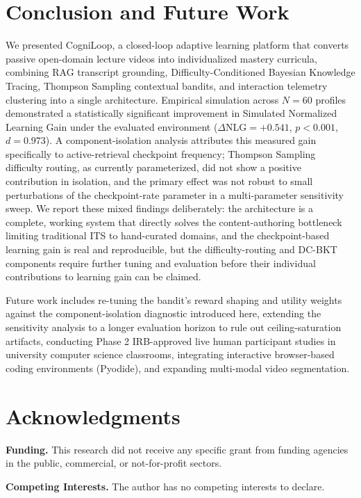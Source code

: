 \documentclass[notitlepage,12pt]{jedm}
\begin{document}
\section{Conclusion and Future Work}
We presented CogniLoop, a closed-loop adaptive learning platform that converts passive open-domain lecture videos into individualized mastery curricula, combining RAG transcript grounding, Difficulty-Conditioned Bayesian Knowledge Tracing, Thompson Sampling contextual bandits, and interaction telemetry clustering into a single architecture. Empirical simulation across $N=60$ profiles demonstrated a statistically significant improvement in Simulated Normalized Learning Gain under the evaluated environment ($\Delta\text{NLG}=+0.541$, $p<0.001$, $d=0.973$). A component-isolation analysis attributes this measured gain specifically to active-retrieval checkpoint frequency; Thompson Sampling difficulty routing, as currently parameterized, did not show a positive contribution in isolation, and the primary effect was not robust to small perturbations of the checkpoint-rate parameter in a multi-parameter sensitivity sweep. We report these mixed findings deliberately: the architecture is a complete, working system that directly solves the content-authoring bottleneck limiting traditional ITS to hand-curated domains, and the checkpoint-based learning gain is real and reproducible, but the difficulty-routing and DC-BKT components require further tuning and evaluation before their individual contributions to learning gain can be claimed.

Future work includes re-tuning the bandit's reward shaping and utility weights against the component-isolation diagnostic introduced here, extending the sensitivity analysis to a longer evaluation horizon to rule out ceiling-saturation artifacts, conducting Phase 2 IRB-approved live human participant studies in university computer science classrooms, integrating interactive browser-based coding environments (Pyodide), and expanding multi-modal video segmentation.

\section*{Acknowledgments}

\noindent\textbf{Funding.} This research did not receive any specific grant from funding agencies in the public, commercial, or not-for-profit sectors.

\noindent\textbf{Competing Interests.} The author has no competing interests to declare.
\end{document}
